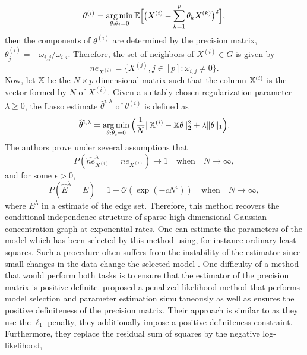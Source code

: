 \begin{equation}
  \theta^{(i)} = \operatorname*{arg\,min}_{\theta:\theta_i=0}{\mathbb E}\Big[\big(X^{(i)}-\sum_{k=1}^p\theta_k X^{(k)}\big)^2\Big],
\end{equation}
then the components of $\theta^{(i)}$ are determined by the precision matrix, $\theta^{(i)}_j=-\omega_{i,j}/\omega_{i,i}$. Therefore, the set of neighbors of $X^{(i)}\in G$ is given by
\begin{equation}
  ne_{X^{(i)}}= \{X^{(j)}, j\in[p]: \omega_{i,j} \neq 0 \}.
\end{equation}
Now, let ${\mathbb X}$ be the $N\times p$-dimensional matrix such that the column ${\mathbb X}^{(i)}$ is the vector formed by $N$ of $X^{(i)}$. Given a suitably chosen regularization parameter $\lambda \geq 0$, the Lasso estimate $\hat\theta^{i,\lambda}$ of $\theta^{(i)}$ is defined as
\begin{equation}
  \widehat\theta^{i,\lambda} = \operatorname*{arg\,min}_{\theta:\theta_i=0}\Big(\frac{1}{N}\|{\mathbb X}^{(i)}-{\mathbb X}\theta \|_2^2 + \lambda\|\theta\|_1 \Big).
\end{equation}
The authors prove under several assumptions that 
\begin{equation}
  P(\hat{ne}_{X^{(i)}}^{\lambda}=ne_{X^{(i)}})\rightarrow 1 \quad \text{when}\quad N\rightarrow \infty,
\end{equation}
and for some $\epsilon > 0$,
\begin{equation}
  P(\hat E^{\lambda}=E)=1-\mathcal{O}(\exp(-cN^{\epsilon}))\quad \text{when}\quad N\rightarrow \infty,
\end{equation}
where $E^{\lambda}$ in a estimate of the edge set. Therefore, this method recovers the conditional independence structure of sparse high-dimensional Gaussian concentration graph at exponential rates. One can estimate the parameters of the model which has been selected by this method using, for instance ordinary least squares. Such a procedure often suffers from the instability of the estimator since small changes in the data change the selected model \citep{yuanLin_graph, breiman1996}. One difficulty of a method that would perform both tasks is to ensure that the estimator of the precision matrix is positive definite. \citep{yuanLin_graph} proposed a penalized-likelihood method that performs model selection and parameter estimation simultaneously as well as ensures the positive definiteness of the precision matrix. Their approach is similar to \citep{meinshausen2006} as they use the $\ell_1$ penalty, they additionally impose a positive definiteness constraint. Furthermore, they replace the residual sum of squares by the negative log-likelihood, 
